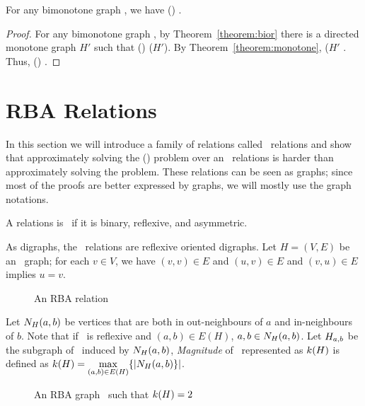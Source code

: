 \begin{theorem} [Bimonotone]
For any bimonotone graph \mH, we have \chom(\mH) \maple \cbis\@.
\end{theorem}

\begin{proof}
For any bimonotone graph \mH, by Theorem~\ref{theorem:bior} there is a directed monotone 
graph \(H'\) such that \chom(\mH) \maple \chom(\(H'\))\@. By Theorem~\ref{theorem:monotone},
\chom(\(H'\) \maple \cbis\@. Thus, \chom(\mH) \maple \cbis\@.
\end{proof}

\section{RBA Relations}
In this section we will introduce a family of relations called \RBA\ relations and show that
approximately solving the \ccsp(\mrelset) problem over an \RBA\ relations is harder than
approximately solving the \cbis problem. These relations
can be seen as graphs; since most of the proofs are better expressed by graphs,
we will mostly use the graph notations.

\begin{defi} [\RBA]
A relations is \RBA\ if it is binary, reflexive, and asymmetric.
\end{defi} 

As digraphs, the \RBA\ relations are reflexive oriented digraphs. Let \(H=(V,E)\) be 
an \RBA\ graph; for each \(v \in V\), we have \((v,v) \in E\)
and \((u,v) \in E\) and \((v,u) \in E\) implies \(u=v\)\@.

\begin{figure}[h]
\center{}
\caption{An RBA relation}
\end{figure}

Let \(N_{H}({a},{b})\) be vertices that are both in out-neighbours of \(a\) and in-neighbours of \(b\).
Note that if \mH\ is reflexive and \((a,b)\in E(H)\),
\(a,b\in N_{H}({a},{b})\)\@. Let \(H_{a,b}\) be the subgraph of \mH\ induced by \(N_{H}({a},{b})\),
\emph{Magnitude} of \mH\ represented as \(k(H)\) is defined as
\(k(H) = \max \limits_{(a,b) \in E(H)} \{{|N_{H}({a},{b})}\}|\)\@.

\begin{figure}[h]
\center{}
\caption{An RBA graph \mH\ such that \(k(H)=2\)}
\end{figure}

